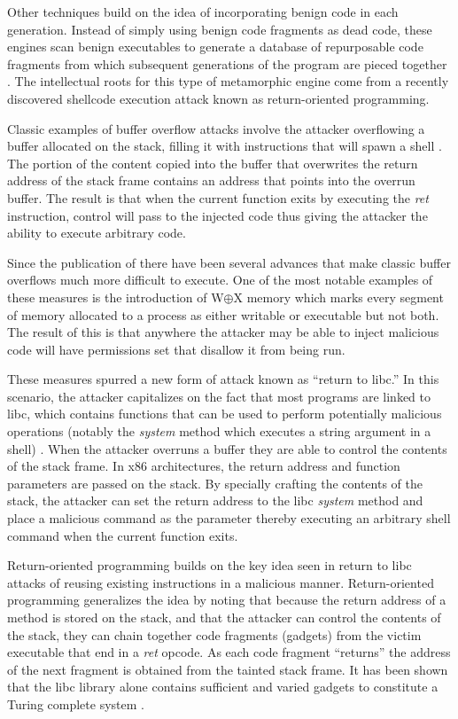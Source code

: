     Other techniques build on the idea of incorporating benign code in each
    generation. Instead of simply using benign code fragments as dead code,
    these engines scan benign executables to generate a database of repurposable
    code fragments from which subsequent generations of the program are pieced
    together \cite{franken}. The intellectual roots for this type of metamorphic
    engine come from a recently discovered shellcode execution attack known as
    return-oriented programming.

    Classic examples of buffer overflow attacks involve the attacker overflowing
    a buffer allocated on the stack, filling it with instructions that will
    spawn a shell \cite{aleph}. The portion of the content copied into the
    buffer that overwrites the return address of the stack frame contains an
    address that points into the overrun buffer. The result is that when the
    current function exits by executing the \emph{ret} instruction, control will
    pass to the injected code thus giving the attacker the ability to execute
    arbitrary code.

    Since the publication of \cite{aleph} there have been several advances that
    make classic buffer overflows much more difficult to execute. One of the
    most notable examples of these measures is the introduction of W$\oplus$X
    memory which marks every segment of memory allocated to a process as either
    writable or executable but not both. The result of this is that anywhere the
    attacker may be able to inject malicious code will have permissions set that
    disallow it from being run.

    These measures spurred a new form of attack known as ``return to libc.'' In
    this scenario, the attacker capitalizes on the fact that most programs are
    linked to libc, which contains functions that can be used to perform
    potentially malicious operations (notably the \emph{system} method which
    executes a string argument in a shell) \cite{rop_geo}. When the attacker
    overruns a buffer they are able to control the contents of the stack frame.
    In x86 architectures, the return address and function parameters are
    passed on the stack. By specially crafting the contents of the stack, the
    attacker can set the return address to the libc \emph{system} method and place
    a malicious command as the parameter thereby executing an arbitrary shell
    command when the current function exits.

    Return-oriented programming builds on the key idea seen in return to libc
    attacks of reusing existing instructions in a malicious manner.
    Return-oriented programming generalizes the idea by noting that because the
    return address of a method is stored on the stack, and that the attacker can
    control the contents of the stack, they can chain together code fragments
    (gadgets) from the victim executable that end in a \emph{ret} opcode. As
    each code fragment ``returns'' the address of the next fragment is obtained
    from the tainted stack frame. It has been shown that the libc library alone
    contains sufficient and varied gadgets to constitute a Turing complete
    system \cite{rop_geo}.

